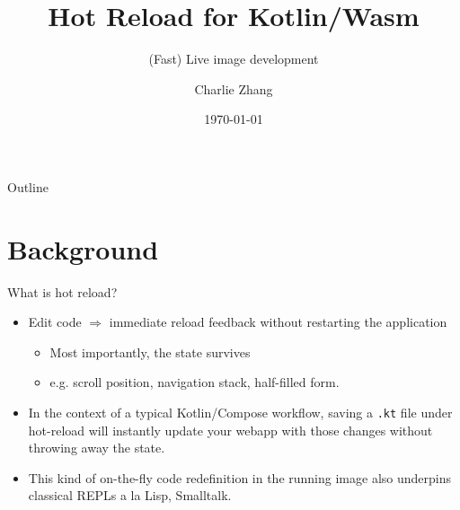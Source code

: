 \documentclass[10pt,presentation]{beamer}
\author{Charlie Zhang}
\date{\today}
\title{Hot Reload for Kotlin/Wasm}
\subtitle{(Fast) Live image development}
\begin{document}
\maketitle
\begin{frame}{Outline}
\tableofcontents
\end{frame}

\section*{Background}
\label{sec:org9668bbf}
\begin{frame}[label={sec:orga539dc6},fragile]{What is hot reload?}
 \begin{itemize}
\item Edit code \(\Rightarrow\) immediate reload feedback without restarting the
application
\begin{itemize}
\item Most importantly, the state survives
\item e.g. scroll position, navigation stack, half-filled form.
\end{itemize}
\item In the context of a typical Kotlin/Compose workflow, saving a \texttt{.kt}
file under hot-reload will instantly update your webapp with those
changes without throwing away the state.
\item This kind of on-the-fly code redefinition in the running image also
underpins classical REPLs a la Lisp, Smalltalk.
\end{itemize}
\end{frame}
\end{document}

